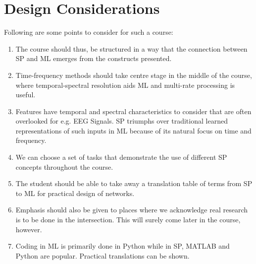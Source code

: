 \documentclass[12pt]{article}
\begin{document}
\section{Design Considerations}
Following are some points to consider for such a course:
\begin{enumerate}
    \item The course should thus, be structured in a way that the connection between SP and ML emerges from the constructs presented. 
    \item Time-frequency methods should take centre stage in the middle of the course, where temporal-spectral resolution aids ML and multi-rate processing is useful.
    \item Features have temporal and spectral characteristics to consider that are often overlooked for e.g. EEG Signals. SP triumphs over traditional learned representations of such inputs in ML because of its natural focus on time and frequency.
    \item We can choose a set of tasks that demonstrate the use of different SP concepts throughout the course.
    \item The student should be able to take away a translation table of terms from SP to ML for practical design of networks.
    \item Emphasis should also be given to places where we acknowledge real research is to be done in the intersection. This will surely come later in the course, however.
    \item Coding in ML is primarily done in Python while in SP, MATLAB and Python are popular. Practical translations can be shown.
\end{enumerate}
\end{document}
